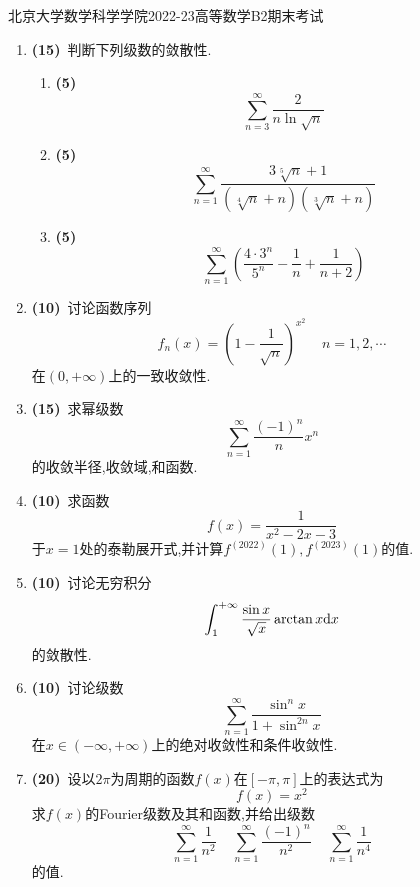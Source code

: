 \documentclass{ctexart}
\begin{document}
\pagestyle{empty}
\begin{center}\Large
    北京大学数学科学学院2022-23高等数学B2期末考试
\end{center}
\begin{enumerate}[leftmargin=*,label=\textbf{\arabic*.},topsep=0pt,parsep=0pt,itemsep=0pt,partopsep=0pt]
    \item \textbf{(15)}\ 判断下列级数的敛散性.
        \begin{enumerate}[label=\tbf{(\arabic*)},topsep=0pt,parsep=0pt,itemsep=0pt,partopsep=0pt]
            \item \textbf{(5)}
                \[\sum_{n=3}^{\infty}\dfrac{2}{n\ln\sqrt{n}}\]
            \item \textbf{(5)}
                \[\sum_{n=1}^{\infty}\dfrac{3\sqrt[5]{n}+1}{\left(\sqrt[4]{n}+n\right)\left(\sqrt[3]{n}+n\right)}\]
            \item \textbf{(5)}
                \[\sum_{n=1}^{\infty}\left(\dfrac{4\cdot3^n}{5^n}-\dfrac{1}{n}+\dfrac{1}{n+2}\right)\]
        \end{enumerate}

    \item \textbf{(10)}\ 讨论函数序列
        \[f_n(x)=\left(1-\dfrac{1}{\sqrt{n}}\right)^{x^2}\ \ \ \ \ n=1,2,\cdots\]
        在$(0,+\infty)$上的一致收敛性.

    \item \textbf{(15)}\ 求幂级数
        \[\sum_{n=1}^{\infty}\dfrac{(-1)^n}{n}x^n\]
        的收敛半径,收敛域,和函数.

    \item \textbf{(10)}\ 求函数
        \[f(x)=\dfrac{1}{x^2-2x-3}\]
        于$x=1$处的泰勒展开式,并计算$f^{(2022)}(1),f^{(2023)}(1)$的值.

    \item \textbf{(10)}\ 讨论无穷积分
        \[\int_1^{+\infty}\dfrac{\sin x}{\sqrt{x}}\arctan x\mathrm{d} x\]
        的敛散性.

    \item \textbf{(10)}\ 讨论级数
        \[\sum_{n=1}^{\infty}\dfrac{\sin^n x}{1+\sin^{2n}x}\]
        在$x\in(-\infty,+\infty)$上的绝对收敛性和条件收敛性.

    \item \textbf{(20)}\ 设以$2\pi$为周期的函数$f(x)$在$[-\pi,\pi]$上的表达式为
        \[f(x)=x^2\]
        求$f(x)$的Fourier级数及其和函数,并给出级数
        \[\sum_{n=1}^{\infty}\dfrac{1}{n^2}
        \ \ \ \ \ \sum_{n=1}^{\infty}\dfrac{(-1)^n}{n^2}
        \ \ \ \ \ \sum_{n=1}^{\infty}\dfrac{1}{n^4}\]
        的值.


\end{enumerate}
\end{document}
